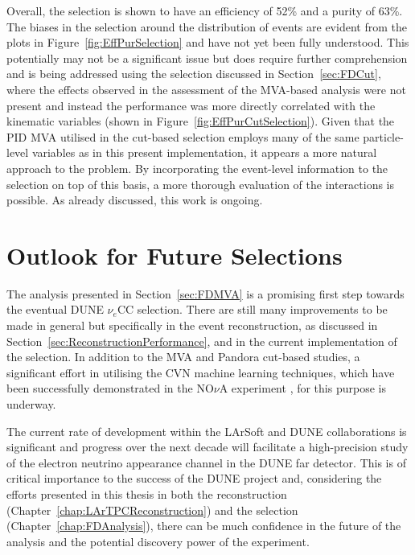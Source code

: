 Overall, the selection is shown to have an efficiency of 52\% and a purity of 63\%.  The biases in the selection around the distribution of events are evident from the plots in Figure~\ref{fig:EffPurSelection} and have not yet been fully understood.  This potentially may not be a significant issue but does require further comprehension and is being addressed using the selection discussed in Section~\ref{sec:FDCut}, where the effects observed in the assessment of the MVA-based analysis were not present and instead the performance was more directly correlated with the kinematic variables (shown in Figure~\ref{fig:EffPurCutSelection}).  Given that the PID MVA utilised in the cut-based selection employs many of the same particle-level variables as in this present implementation, it appears a more natural approach to the problem.  By incorporating the event-level information to the selection on top of this basis, a more thorough evaluation of the interactions is possible.  As already discussed, this work is ongoing.

\section{Outlook for Future Selections}\label{sec:FDOutlook}

The analysis presented in Section~\ref{sec:FDMVA} is a promising first step towards the eventual DUNE $\nu_e$CC selection.  There are still many improvements to be made in general but specifically in the event reconstruction, as discussed in Section~\ref{sec:ReconstructionPerformance}, and in the current implementation of the selection.  In addition to the MVA and Pandora cut-based studies, a significant effort in utilising the CVN machine learning techniques, which have been successfully demonstrated in the NO$\nu$A experiment \cite{Aurisano2016}, for this purpose is underway.

The current rate of development within the LArSoft and DUNE collaborations is significant and progress over the next decade will facilitate a high-precision study of the electron neutrino appearance channel in the DUNE far detector.  This is of critical importance to the success of the DUNE project and, considering the efforts presented in this thesis in both the reconstruction (Chapter~\ref{chap:LArTPCReconstruction}) and the selection (Chapter~\ref{chap:FDAnalysis}), there can be much confidence in the future of the analysis and the potential discovery power of the experiment.
